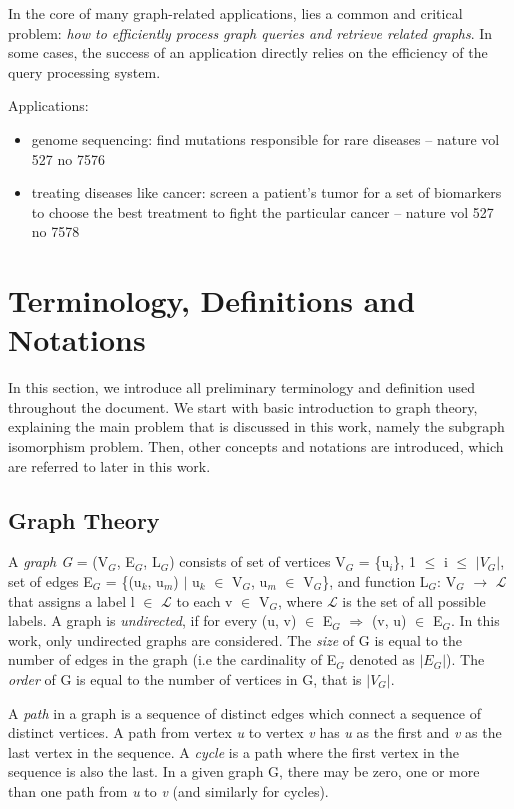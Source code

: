 \documentclass{l4proj}
\newcommand{\Lagr}{\mathcal{L}}
\begin{document}
        In the core of many graph-related applications, lies a common and critical problem: \textit{how to efficiently process graph queries and retrieve related graphs}. In some cases, the success of an application directly relies on the efficiency of the query processing system.  
        
        Applications:
        \begin{itemize}
        \item genome sequencing: find mutations responsible for rare diseases -- nature vol 527 no 7576
        \item treating diseases like cancer: screen a patient's tumor for a set of biomarkers to choose the best treatment to fight the particular cancer -- nature vol 527 no 7578
        \end{itemize}

\section{Terminology, Definitions and Notations}
\label{sec:theory}
In this section, we introduce all preliminary terminology and definition used throughout the document. We start with basic introduction to graph theory, explaining the main problem that is discussed in this work, namely the subgraph isomorphism problem. Then, other concepts and notations are introduced, which are referred to later in this work.

\subsection{Graph Theory}
\label{sec:graphTheory}
A \textit{graph G} = (V$_{G}$, E$_{G}$, L$_{G}$) consists of set of vertices V$_{G}$ = \{u$_i$\}, 1 $\leq$ i $\leq$ $|V_{G}|$, set of edges E$_{G}$ = \{(u$_k$, u$_m$) $|$ u$_k$ $\in$ V$_{G}$, u$_m$ $\in$ V$_{G}$\}, and  function  L$_{G}$: V$_{G}$ $\rightarrow$ $\Lagr$ that assigns a label l $\in$ $\Lagr$ to each v $\in$ V$_{G}$, where $\Lagr$ is the set of all possible labels. A graph is \textit{undirected}, if for every (u, v) $\in$ E$_{G}$ $\Rightarrow$ (v, u) $\in$ E$_{G}$. In this work, only undirected graphs are considered. The \textit{size} of G is equal to the number of edges in the graph (i.e the cardinality of E$_{G}$ denoted as $|E_{G}|$). The \textit{order} of G is equal to the number of vertices in G, that is $|V_{G}|$.

A \textit{path} in a graph is a sequence of distinct edges which connect a sequence of distinct vertices. A path from vertex \textit{u} to vertex \textit{v} has \textit{u} as the first and \textit{v} as the last vertex in the sequence. A \textit{cycle} is a path where the first vertex in the sequence is also the last. In a given graph G, there may be zero, one or more than one path from \textit{u} to \textit{v} (and similarly for cycles).
\end{document}
